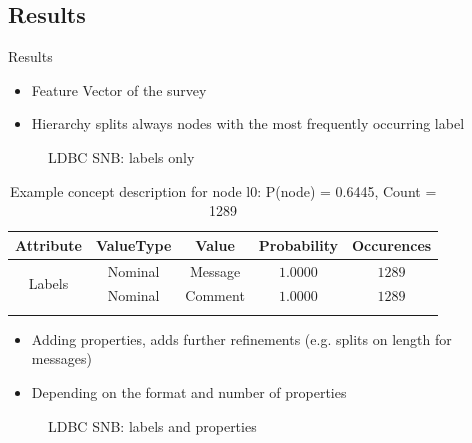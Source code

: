 \documentclass[rgb]{beamer}
\begin{document}
    \subsection{Results}
        \begin{frame}[allowframebreaks]{Results}
            \begin{multicols}{2}
                \begin{itemize}
                    \item Feature Vector of the survey
                    \item Hierarchy splits always nodes with the most frequently occurring label
                \end{itemize}
            \vfill\null
            \columnbreak
                \begin{figure}[htp]
                    \centering
                     
                    \caption{LDBC SNB: labels only}
                \end{figure}{}
            \end{multicols}
            \begin{table}[H] 
                 \begin{longtable}{|c|c|c|c|c|} \hline 
                    Attribute & ValueType & Value & Probability & Occurences \\ \hline 
                    \multirow{2}{*}{Labels} & Nominal & Message & $1.0000$ & $1289$ \\ \cline{2-5} 
                     & Nominal & Comment & $1.0000$ & $1289$ \\ \hline 
                 \caption{Example concept description for node l0: P(node) = 0.6445, Count = 1289}\label{l0ex}
                \end{longtable}
            \end{table} 
         
             \begin{itemize}
                 \item Adding properties, adds further refinements (e.g. splits on length for messages)
                 \item Depending on the format and number of properties
             \end{itemize}
             \begin{figure}[htp]
                \centering
                 
                \caption{LDBC SNB: labels and properties}
            \end{figure}{}
        \framebreak
        

\end{frame}
\end{document}
